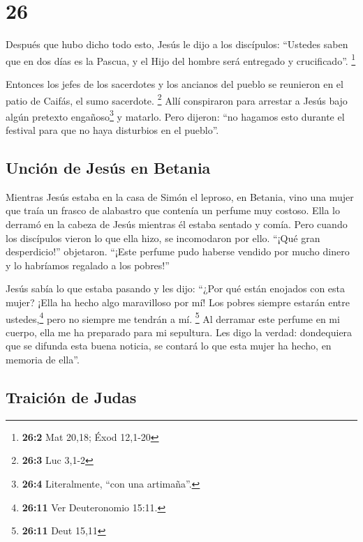 \hypertarget{section-25}{%
\section{26}\label{section-25}}

 Después que hubo dicho todo esto, Jesús le dijo a los
discípulos:  ``Ustedes saben que en dos días es la Pascua,
y el Hijo del hombre será entregado y crucificado''. \footnote{\textbf{26:2}
  Mat 20,18; Éxod 12,1-20}

 Entonces los jefes de los sacerdotes y los ancianos del
pueblo se reunieron en el patio de Caifás, el sumo sacerdote.
\footnote{\textbf{26:3} Luc 3,1-2}  Allí conspiraron para
arrestar a Jesús bajo algún pretexto engañoso\footnote{\textbf{26:4}
  Literalmente, ``con una artimaña''.} y matarlo.  Pero
dijeron: ``no hagamos esto durante el festival para que no haya
disturbios en el pueblo''.

\hypertarget{unciuxf3n-de-jesuxfas-en-betania}{%
\subsection{Unción de Jesús en
Betania}\label{unciuxf3n-de-jesuxfas-en-betania}}

 Mientras Jesús estaba en la casa de Simón el leproso, en
Betania,  vino una mujer que traía un frasco de alabastro
que contenía un perfume muy costoso. Ella lo derramó en la cabeza de
Jesús mientras él estaba sentado y comía. Pero cuando los discípulos
vieron lo que ella hizo, se incomodaron por ello.  ``¡Qué
gran desperdicio!'' objetaron.  ``¡Este perfume pudo
haberse vendido por mucho dinero y lo habríamos regalado a los pobres!''

 Jesús sabía lo que estaba pasando y les dijo: ``¿Por qué
están enojados con esta mujer? ¡Ella ha hecho algo maravilloso por mí!
 Los pobres siempre estarán entre ustedes,\footnote{\textbf{26:11}
  Ver Deuteronomio 15:11.} pero no siempre me tendrán a mí. \footnote{\textbf{26:11}
  Deut 15,11}  Al derramar este perfume en mi cuerpo,
ella me ha preparado para mi sepultura.  Les digo la
verdad: dondequiera que se difunda esta buena noticia, se contará lo que
esta mujer ha hecho, en memoria de ella''.

\hypertarget{traiciuxf3n-de-judas}{%
\subsection{Traición de Judas}\label{traiciuxf3n-de-judas}}

